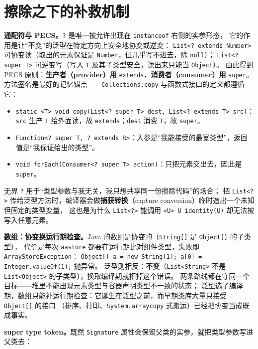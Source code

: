 \documentclass[12pt,a4paper,fontset=fandol]{ctexbook}
\newcommand{\kw}[1]{\texttt{#1}}
\begin{document}
\section{擦除之下的补救机制}

\textbf{通配符与 PECS。}\kw{?} 是唯一被允许出现在 \kw{instanceof} 右侧的实参形态，
它的作用是让“不变”的泛型在特定方向上安全地协变或逆变：
\kw{List<? extends Number>} 可协变读（取出的元素保证是 \kw{Number}，但几乎写不进去，除 \kw{null}）；
\kw{List<? super T>} 可逆变写（写入 \kw{T} 及其子类型安全，读出来只能当 \kw{Object}）。
由此得到 PECS 原则：\textbf{生产者（provider）用} \kw{extends}，\textbf{消费者（consumer）用} \kw{super}。
方法签名是最好的记忆锚点——\kw{Collections.copy} 与函数式接口的定义都遵循它：

\begin{itemize}
  \item \kw{static <T> void copy(List<? super T> dest, List<? extends T> src)}：\kw{src} 生产 \kw{T} 给外面读，故 \kw{extends}；\kw{dest} 消费 \kw{T}，故 \kw{super}。
  \item \kw{Function<? super T, ? extends R>}：入参是“我能接受的最宽类型”，返回值是“我保证给出的类型”。
  \item \kw{void forEach(Consumer<? super T> action)}：只把元素交出去，因此是 \kw{super}。
\end{itemize}

无界 \kw{?} 用于“类型参数与我无关，我只想共享同一份擦除代码”的场合；
把 \kw{List<?>} 传给泛型方法时，编译器会做\textbf{捕获转换}（capture conversion）临时造出一个未知但固定的类型变量，
这也是为什么 \kw{List<?>} 能调用 \kw{<U> U identity(U)} 却无法被写入任意元素。

\textbf{数组：协变换运行期检查。}Java 的数组是协变的（\kw{String[]} 是 \kw{Object[]} 的子类型），
代价是每次 \kw{aastore} 都要在运行期比对组件类型，失败即 \kw{ArrayStoreException}：
\kw{Object[] a = new String[1]; a[0] = Integer.valueOf(1);} 抛异常。
泛型则相反：\textbf{不变}（\kw{List<String>} 不是 \kw{List<Object>} 的子类型），换取编译期就拒掉这个错误。
两条路线都在守同一个目标——堆里不能出现元素类型与容器声明类型不一致的状态；
泛型选了编译期，数组只能补运行期检查：它诞生在泛型之前，而早期类库大量只接受 \kw{Object[]} 的接口
（排序、打印、\kw{System.arraycopy} 式搬运）已经把协变当成既成事实。

\textbf{super type token。}既然 \kw{Signature} 属性会保留父类的实参，就把类型参数写进父类去：
\end{document}

